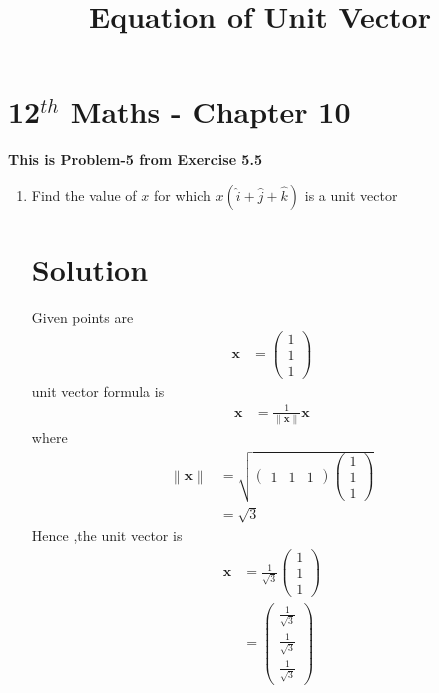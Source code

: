 \documentclass[12pt]{article}
\providecommand{\norm}[1]{\left\lVert#1\right\rVert}
\newcommand{\myvec}[1]{\ensuremath{\begin{pmatrix}#1\end{pmatrix}}}
\let\vec\mathbf
\begin{document}
\begin{center}
\title{\textbf{Equation  of Unit Vector}}
\date{\vspace{-5ex}} %
\maketitle
\end{center}
\setcounter{page}{1}
\section{12$^{th}$ Maths - Chapter 10}
\textbf{This is Problem-5 from Exercise 5.5}
\begin{enumerate}
\item Find the value of $x$ for which $x(\hat{i}+\hat{j}+\hat{k})$ is a unit vector
\section{Solution}
Given points are
\begin{align} 
\vec{x}&=\myvec{1\\1\\1}
\end{align}
unit vector formula is
\begin{align}
\vec{x} &=\frac{1}{\norm{\vec{x}}}\vec{x}
\end{align}
where
\begin{align}
\norm{\vec{x}}&=\sqrt{\myvec{1& 1& 1}\myvec{1\\1\\1}}\\
&=\sqrt{3}
\end{align}
Hence ,the unit vector is
\begin{align}
\vec{x}&=\frac{1}{\sqrt{3}}\myvec{1\\1\\1}\\
&=\myvec{\frac{1}{\sqrt{3}}\\[2pt] \frac{1}{\sqrt{3}}\\[2pt] \frac{1}{\sqrt{3}}}
\end{align}	  
\end{enumerate} 
\end{document}
